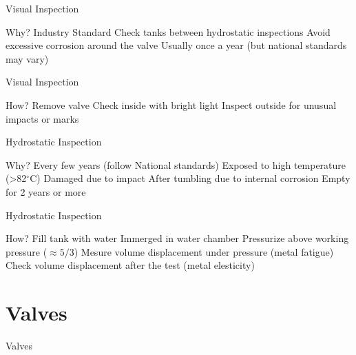 \documentclass[aspectratio=1610,english,14pt]{beamer}
\begin{document}
\begin{frame}{Visual Inspection}
	\begin{outline}
		\1 Why?
			\2	Industry Standard
			\2 Check tanks between hydrostatic inspections
			\2 Avoid excessive corrosion around the valve
			\2 Usually once a year (but national standards may vary)
	\end{outline}
\end{frame}
\begin{frame}{Visual Inspection}
	\begin{outline}
		\1 How?
			\2 Remove valve
			\2 Check inside with bright light
			\2 Inspect outside for unusual impacts or marks
	\end{outline}
\end{frame}
\begin{frame}{Hydrostatic Inspection}
	\begin{outline}
		\1 Why?
			\2 Every few years (follow National standards)
			\2 Exposed to high temperature (>82$^\circ$C)
			\2 Damaged due to impact
			\2 After tumbling due to internal corrosion
			\2 Empty for 2 years or more
	\end{outline}
\end{frame}
\begin{frame}{Hydrostatic Inspection}
	\begin{outline}
		\1 How?
			\2 Fill tank with water
			\2 Immerged in water chamber
			\2 Pressurize above working pressure ($\approx 5/3$)
			\2 Mesure volume displacement under pressure
			\3 (metal fatigue)
			\2 Check volume displacement after the test
			\3 (metal elesticity)
	\end{outline}
\end{frame}

\section{Valves}

\begin{frame}{Valves}
\end{frame}
\end{document}
